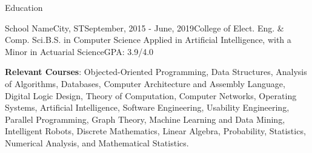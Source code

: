 \begin{resume_section}{Education}
  \begin{resume_education}{School Name}{City, ST}{September, 2015 - June, 2019}{College of Elect. Eng. \& Comp. Sci.}{B.S. in Computer Science Applied in Artificial Intelligence, with a Minor in Actuarial Science}{GPA: 3.9/4.0}
  \hfill
    \vspace{-.5cm}
    \begin{subitems}
      \item[] \textbf{Relevant Courses}: Objected-Oriented Programming, Data Structures, Analysis of Algorithms, Databases, Computer Architecture and Assembly Language, Digital Logic Design, Theory of Computation, Computer Networks, Operating Systems, Artificial Intelligence, Software Engineering, Usability Engineering, Parallel Programming, Graph Theory, Machine Learning and Data Mining, Intelligent Robots, Discrete Mathematics, Linear Algebra, Probability, Statistics, Numerical Analysis, and Mathematical Statistics.
    \end{subitems}
    \vspace{-.5cm}
  \end{resume_education}
\end{resume_section}